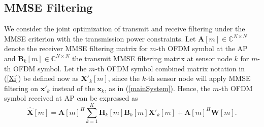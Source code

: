 \documentclass[journal]{IEEEtran}
\theoremstyle{definition}
\begin{document}
	\subsection{MMSE Filtering}
We consider the joint optimization of transmit and receive filtering under the MMSE criterion with the transmission power constraints. Let $\mathbf{A}[m] \in \mathbb{C}^{N \times N}$ denote the receiver MMSE filtering matrix for $m$-th OFDM symbol at the AP and $\mathbf{B}_k[m] \in \mathbb{C}^{N \times N}$ the transmit MMSE filtering matrix at sensor node $k$ for $m$-th OFDM symbol. Let the $m$-th OFDM symbol combined matrix notation in (\ref{Xi}) be  defined now as $\mathbf{X}'_k[m]$, since the $k$-th sensor node will apply MMSE filtering on $\mathbf{x}'_k$ instead of the $\mathbf{x}_k$, as in (\ref{mainSystem}). Hence, the $m$-th OFDM symbol received at AP can be expressed as
 \begin{equation}
 \label{ReceivedFusion}
 \mathbf{\hat{X}}[m] = \mathbf{A}[m]^H\sum_{k =1}^K   \mathbf{H}_k[m] \mathbf{B}_k[m] \mathbf{X}'_k[m] +\mathbf{A}[m]^H\mathbf{W}[m].
 \end{equation} \vspace{-0.1cm}
 
\end{document}

